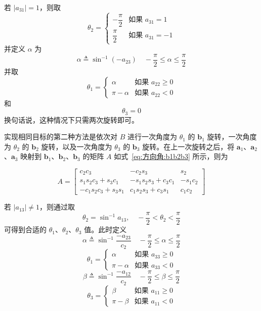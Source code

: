 若 $|a_{31}| = 1$，则取
$$
\theta_2 = \begin{cases} -\dfrac{\pi}{2} & \text{如果 } a_{31} = 1 \\[4pt] \dfrac{\pi}{2} & \text{如果 } a_{31} = -1 \end{cases}
$$
并定义 $\alpha$ 为
$$
\alpha \triangleq \sin^{-1}(-a_{23}) \quad -\frac{\pi}{2} \le \alpha \le \frac{\pi}{2}
$$
并取
$$
\theta_1 = \begin{cases} \alpha & \text{如果 } a_{22} \ge 0 \\ \pi - \alpha & \text{如果 } a_{22} < 0 \end{cases}
$$
和
$$
\theta_3 = 0
$$
换句话说，这种情况下只需两次旋转即可。
\blocksep

实现相同目标的第二种方法是依次对 $B$ 进行一次角度为 $\theta_1$ 的 $\mathbf{b}_1$ 旋转，一次角度为 $\theta_2$ 的 $\mathbf{b}_2$ 旋转，以及一次角度为 $\theta_3$ 的 $\mathbf{b}_3$ 旋转。在上一次旋转之后，将 $\mathbf{a}_1$、$\mathbf{a}_2$、$\mathbf{a}_3$ 映射到 $\mathbf{b}_1$、$\mathbf{b}_2$、$\mathbf{b}_3$ 的矩阵 $A$ 如式~\eqref{eq:方向角:b1b2b3} 所示，则为

\begin{equation}\label{eq:方向角:b1b2b3}
A = \left[
\begin{array}{ccc}
c_2 c_3 & -c_2 s_3 & s_2 \\
s_1 s_2 c_3 + s_3 c_1 & -s_1 s_2 s_3 + c_3 c_1 & -s_1 c_2 \\
-c_1 s_2 c_3 + s_3 s_1 & c_1 s_2 s_3 + c_3 s_1 & c_1 c_2
\end{array}
\right]
\end{equation}

若 $|a_{13}| \ne 1$，则通过取
$$
\theta_2 = \sin^{-1} a_{13},\quad -\frac{\pi}{2} < \theta_2 < \frac{\pi}{2}
$$
可得到合适的 $\theta_1$、$\theta_2$、$\theta_3$ 值。此时定义
$$
\alpha \triangleq \sin^{-1}\frac{-a_{23}}{c_2} \quad -\frac{\pi}{2} \le \alpha \le \frac{\pi}{2}
$$
$$
\theta_1 = \begin{cases} \alpha & \text{如果 } a_{33} \ge 0 \\ \pi - \alpha & \text{如果 } a_{33} < 0 \end{cases}
$$
$$
\beta \triangleq \sin^{-1}\frac{-a_{12}}{c_2} \quad -\frac{\pi}{2} \le \beta \le \frac{\pi}{2}
$$
$$
\theta_3 = \begin{cases} \beta & \text{如果 } a_{11} \ge 0 \\ \pi - \beta & \text{如果 } a_{11} < 0 \end{cases}
$$

